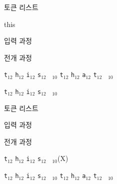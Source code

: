 \documentclass{beamer}
\begin{document}
%
\begin{frame}[fragile]{토큰 리스트}
\begin{verbatim*}
\def\tokentwo{\iftrue this \else that \fi}
\tokentwo
\end{verbatim*}
    \bigskip
    \alert{입력 과정}
    
    
    \bigskip
    \alert{전개 과정}
    
    \quad
    \verb|t|$_{12}$\quad
    \verb|h|$_{12}$\quad
    \verb|i|$_{12}$\quad
    \verb|s|$_{12}$\quad
    \verb*| |$_{10}$\quad
    \quad
    \verb|t|$_{12}$\quad
    \verb|h|$_{12}$\quad
    \verb|a|$_{12}$\quad
    \verb|t|$_{12}$\quad
    \verb*| |$_{10}$\quad

    \bigskip
    \verb|t|$_{12}$\quad
    \verb|h|$_{12}$\quad
    \verb|i|$_{12}$\quad
    \verb|s|$_{12}$\quad
    \verb*| |$_{10}$\quad
\end{frame}


%
\begin{frame}[fragile]{토큰 리스트}
\begin{verbatim*}
\def\tokentwo{\iftrue this \else that \fi}
\def\tokenone#1{...}
\expandafter\tokenone\tokentwo
\end{verbatim*}
    \bigskip

    \alert{입력 과정}
    
    \quad
    \quad
    
    \bigskip
    \alert{전개 과정}

    \quad
    \verb|t|$_{12}$\quad
    \verb|h|$_{12}$\quad
    \verb|i|$_{12}$\quad
    \verb|s|$_{12}$\quad
    \verb*| |$_{10}$\quad (X)

    \bigskip
    \quad
    \quad
    \verb|t|$_{12}$\quad
    \verb|h|$_{12}$\quad
    \verb|i|$_{12}$\quad
    \verb|s|$_{12}$\quad
    \verb*| |$_{10}$\quad
    \quad
    \verb|t|$_{12}$\quad
    \verb|h|$_{12}$\quad
    \verb|a|$_{12}$\quad
    \verb|t|$_{12}$\quad
    \verb*| |$_{10}$\quad
\end{frame}
\end{document}
